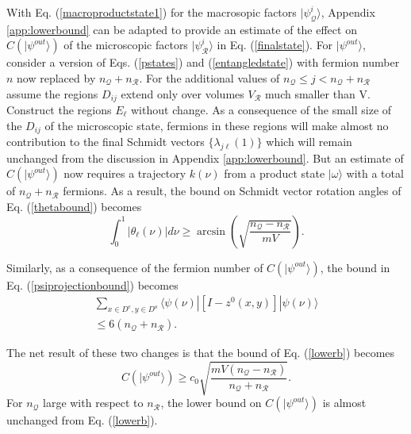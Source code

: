 \documentclass[12pt,amsmath,amssymb,onecolumn]{revtex4-2}
\begin{document}
With Eq. (\ref{macroproductstate1}) for the macrosopic factors $|\psi^i_{\mathcal{Q}} \rangle $,
Appendix \ref{app:lowerbound} can be adapted to provide an
estimate of the effect on $C( |\psi^{out} \rangle )$
of the microscopic factors $|\psi^i_{\mathcal{R}} \rangle $ in Eq. (\ref{finalstate}). 
For $|\psi^{out} \rangle $, consider a version of Eqs. (\ref{pstates}) and (\ref{entangledstate}) 
with fermion number $n$ now replaced by $n_{\mathcal{Q}} + n_{\mathcal{R}}$. 
For the additional values of $n_{\mathcal{Q}} \le j < n_{\mathcal{Q}} + n_{\mathcal{R}}$
assume the regions $D_{ij}$ extend only over volumes $V_{\mathcal{R}}$ much smaller than V.
Construct the regions $E_\ell$ without change.  As a consequence
of the small size of the $D_{ij}$ of the microscopic state, fermions in these
regions will make almost no contribution to the final Schmidt vectors
$\{\lambda_{j\ell} (1)\}$ which will remain unchanged from the discussion in 
Appendix \ref{app:lowerbound}.
But an estimate of 
$C( |\psi^{out} \rangle )$ now requires a trajectory $k(\nu)$ from a product state $|\omega \rangle $ with a total of
$n_{\mathcal{Q}} + n_{\mathcal{R}}$ fermions. As a result, the bound on Schmidt vector
rotation angles of Eq. (\ref{thetabound}) becomes
\begin{equation}
\label{thetaboundscattering}
\int_0^1 | \theta_{\ell}(\nu)| d \nu \ge \arcsin( \sqrt{\frac{n_{\mathcal{Q}} - n_{\mathcal{R}}}{mV}}).
\end{equation}

Similarly, as a consequence of the fermion number of $C( |\psi^{out} \rangle )$,
the bound in Eq. (\ref{psiprojectionbound}) becomes 
\begin{multline}
\label{psiprojectionboundscattering}
\sum_{x \in D^e, y \in D^o}  \langle \psi(\nu)| [I - z^0(x,y)]|\psi(\nu) \rangle  \\ \le 6(n_{\mathcal{Q}} + n_{\mathcal{R}}).
\end{multline}

The net result of these two changes is that the bound of Eq. (\ref{lowerb}) becomes
\begin{equation}
\label{cbound1}
C( |\psi^{out} \rangle ) \ge c_0 \sqrt{ \frac{mV(n_{\mathcal{Q}} - n_{\mathcal{R}})}{n_{\mathcal{Q}} + n_{\mathcal{R}}}}.
\end{equation}
For $n_{\mathcal{Q}}$ large with respect to $n_{\mathcal{R}}$, the lower bound on 
$C( |\psi^{out} \rangle )$ is almost unchanged from Eq. (\ref{lowerb}). 
\end{document}
